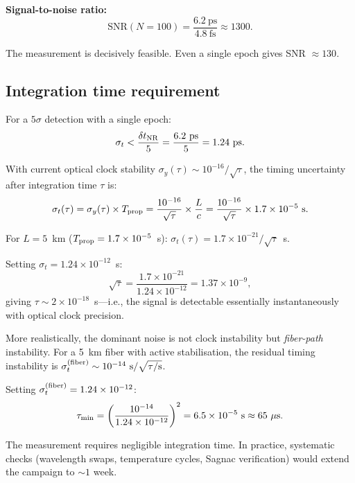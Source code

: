 \documentclass[aps,prl,twocolumn,superscriptaddress,showpacs]{revtex4-2}
\begin{document}
\textbf{Signal-to-noise ratio:}
\begin{equation}
\text{SNR}(N = 100) = \frac{6.2~\text{ps}}{4.8~\text{fs}} \approx 1300.
\end{equation}

The measurement is decisively feasible.  Even a single epoch
gives SNR $\approx 130$.

\subsection{Integration time requirement}

For a $5\sigma$ detection with a single epoch:
\begin{equation}
\sigma_t < \frac{\delta t_{\rm NR}}{5} = \frac{6.2~\text{ps}}{5}
= 1.24~\text{ps}.
\end{equation}

With current optical clock stability $\sigma_y(\tau)
\sim 10^{-16}/\sqrt{\tau}$, the timing uncertainty after
integration time $\tau$ is:
\begin{equation}
\sigma_t(\tau) = \sigma_y(\tau)\times T_{\rm prop}
= \frac{10^{-16}}{\sqrt{\tau}}\times\frac{L}{c}
= \frac{10^{-16}}{\sqrt{\tau}}\times 1.7\times 10^{-5}~\text{s}.
\end{equation}

For $L = 5$~km ($T_{\rm prop} = 1.7\times 10^{-5}$~s):
$\sigma_t(\tau) = 1.7\times 10^{-21}/\sqrt{\tau}$~s.

Setting $\sigma_t = 1.24\times 10^{-12}$~s:
\begin{equation}
\sqrt{\tau} = \frac{1.7\times 10^{-21}}{1.24\times 10^{-12}}
= 1.37\times 10^{-9},
\end{equation}
giving $\tau \sim 2\times 10^{-18}$~s---i.e., the signal is
detectable essentially instantaneously with optical clock precision.

More realistically, the dominant noise is not clock instability
but \emph{fiber-path} instability.  For a 5~km fiber with active
stabilisation, the residual timing instability is
$\sigma_t^{(\rm fiber)} \sim 10^{-14}~\text{s}/\sqrt{\tau/\text{s}}$.

Setting $\sigma_t^{(\rm fiber)} = 1.24\times 10^{-12}$:
\begin{equation}
\tau_{\rm min} = \left(\frac{10^{-14}}{1.24\times 10^{-12}}\right)^2
= 6.5\times 10^{-5}~\text{s} \approx 65~\mu\text{s}.
\end{equation}

The measurement requires negligible integration time.  In practice,
systematic checks (wavelength swaps, temperature cycles,
Sagnac verification) would extend the campaign to $\sim 1$ week.
\end{document}
